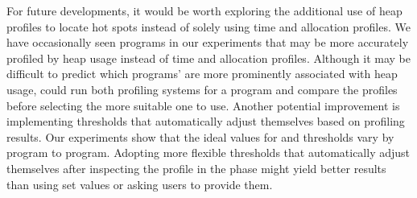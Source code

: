 For future developments, it would be worth exploring the additional
use of heap profiles to locate hot spots instead of solely using time
and allocation profiles. We have occasionally seen programs in our
experiments that may be more accurately profiled by heap usage instead
of time and allocation profiles. Although it may be difficult to
predict which programs' \hotspots{} are more prominently associated
with heap usage, \At{} could run both profiling systems for a program
and compare the profiles before selecting the more suitable one to
use. Another potential improvement is implementing thresholds
that automatically adjust themselves based on profiling results. Our
experiments show that the ideal values for \hotspotcost{} and \absim{}
thresholds vary by program to program. Adopting more flexible
thresholds that automatically adjust themselves after inspecting the
profile in the \preopt{} phase might yield better results than using
set values or asking users to provide them.

